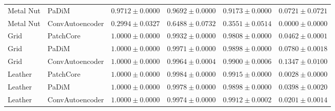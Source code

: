 \begin{table}[t]
{\begin{tabular}{llcccc}
Metal Nut & PaDiM & $0.9712 \pm 0.0000$ & $0.9692 \pm 0.0000$ & $0.9173 \pm 0.0000$ & $0.0721 \pm 0.0721$ \\
Metal Nut & ConvAutoencoder & $0.2994 \pm 0.0327$ & $0.6488 \pm 0.0732$ & $0.3551 \pm 0.0514$ & $0.0000 \pm 0.0000$ \\
\midrule
Grid & PatchCore & $1.0000 \pm 0.0000$ & $0.9932 \pm 0.0000$ & $0.9808 \pm 0.0000$ & $0.0462 \pm 0.0001$ \\
Grid & PaDiM & $1.0000 \pm 0.0000$ & $0.9971 \pm 0.0000$ & $0.9898 \pm 0.0000$ & $0.0780 \pm 0.0018$ \\
Grid & ConvAutoencoder & $1.0000 \pm 0.0000$ & $0.9964 \pm 0.0004$ & $0.9900 \pm 0.0006$ & $0.1347 \pm 0.0100$ \\
\midrule
Leather & PatchCore & $1.0000 \pm 0.0000$ & $0.9984 \pm 0.0000$ & $0.9915 \pm 0.0000$ & $0.0028 \pm 0.0000$ \\
Leather & PaDiM & $1.0000 \pm 0.0000$ & $0.9978 \pm 0.0000$ & $0.9898 \pm 0.0000$ & $0.0398 \pm 0.0020$ \\
Leather & ConvAutoencoder & $1.0000 \pm 0.0000$ & $0.9974 \pm 0.0000$ & $0.9912 \pm 0.0002$ & $0.0201 \pm 0.0014$ \\
\bottomrule
\end{tabular}}
\end{table}
